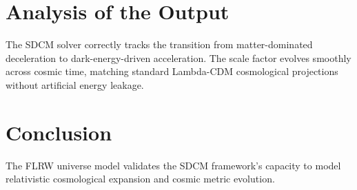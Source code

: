 \section{Analysis of the Output}
The SDCM solver correctly tracks the transition from matter-dominated deceleration to dark-energy-driven acceleration. The scale factor evolves smoothly across cosmic time, matching standard Lambda-CDM cosmological projections without artificial energy leakage.

\section{Conclusion}
The FLRW universe model validates the SDCM framework's capacity to model relativistic cosmological expansion and cosmic metric evolution.